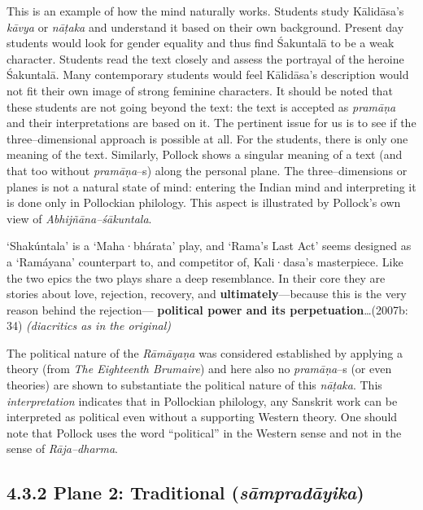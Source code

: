 This is an example of how the mind naturally works. Students study Kālidāsa’s \textit{kāvya} or \textit{nāṭaka} and understand it based on their own background. Present day students would look for gender equality and thus find Śakuntalā to be a weak character. Students read the text closely and assess the portrayal of the heroine Śakuntalā. Many contemporary students would feel Kālidāsa’s description would not fit their own image of strong feminine characters. It should be noted that these students are not going beyond the text: the text is accepted as \textit{pramāṇa} and their interpretations are based on it. The pertinent issue for us is to see if the three–dimensional approach is possible at all. For the students, there is only one meaning of the text. Similarly, Pollock shows a singular meaning of a text (and that too without \textit{pramāṇa}–s) along the personal plane. The three–dimensions or planes is not a natural state of mind: entering the Indian mind and interpreting it is done only in Pollockian philology. This aspect is illustrated by Pollock’s own view of \textit{Abhijñāna–śākuntala}.

\begin{myquote}
‘Shakúntala’ is a ‘Maha·bhárata’ play, and ‘Rama’s Last Act’ seems designed as a ‘Ramáyana’ counterpart to, and competitor of, Kali·dasa’s masterpiece. Like the two epics the two plays share a deep resemblance. In their core they are stories about love, rejection, recovery, and \textbf{ultimately}—because this is the very reason behind the rejection— \textbf{political power and its perpetuation}…(2007b: 34) \textit{(diacritics as in the original)}
\end{myquote}

The political nature of the \textit{Rāmāyaṇa }was considered established by applying a theory (from\textit{ The Eighteenth Brumaire}) and here also no \textit{pramāṇa}–s (or even theories) are shown to substantiate the political nature of this \textit{nāṭaka}. This \textit{interpretation} indicates that in Pollockian philology, any Sanskrit work can be interpreted as political even without a supporting Western theory. One should note that Pollock uses the word “political” in the Western sense and not in the sense of \textit{Rāja–dharma}.

\newpage

\subsection*{4.3.2 Plane 2: Traditional ({\it {\bfseries sāmpradāyika}})}

